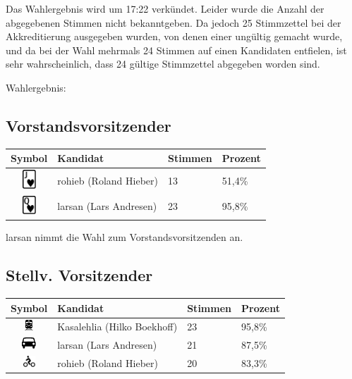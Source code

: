 \documentclass[a4paper,12pt]{scrartcl}
\begin{document}
Das Wahlergebnis wird um 17:22 verkündet. Leider wurde die Anzahl der
abgegebenen Stimmen nicht bekanntgeben. Da jedoch 25 Stimmzettel bei der
Akkreditierung ausgegeben wurden, von denen einer ungültig gemacht wurde, und
da bei der Wahl mehrmals 24 Stimmen auf einen Kandidaten entfielen, ist sehr
wahrscheinlich, dass 24 gültige Stimmzettel abgegeben worden sind.

Wahlergebnis:

\subsection*{Vorstandsvorsitzender}
\begin{tabular}{|c|l|l|l|}
  \hline
  \textbf{Symbol} & \textbf{Kandidat} & \textbf{Stimmen} & \textbf{Prozent} \\
  \hline
  \includegraphics[height=20pt]{images/mv20151206-wahl-1v-1.pdf} &
  rohieb (Roland Hieber) & 13 & 51{,}4\% \\
  \includegraphics[height=20pt]{images/mv20151206-wahl-1v-2.pdf} &
  larsan (Lars Andresen) & 23 & 95{,}8\% \\
  \hline
\end{tabular}

larsan nimmt die Wahl zum Vorstandsvorsitzenden an.

\subsection*{Stellv. Vorsitzender}
\begin{tabular}{|c|l|l|l|}
  \hline
  \textbf{Symbol} & \textbf{Kandidat} & \textbf{Stimmen} & \textbf{Prozent} \\
  \hline
  \includegraphics[height=12pt]{images/mv20151206-wahl-2v-1.pdf} &
  Kasalehlia (Hilko Boekhoff)  & 23 & 95{,}8\% \\
  \includegraphics[height=12pt]{images/mv20151206-wahl-2v-2.pdf} &
  larsan (Lars Andresen)       & 21 & 87{,}5\% \\
  \includegraphics[height=12pt]{images/mv20151206-wahl-2v-3.pdf} &
  rohieb (Roland Hieber)       & 20 & 83{,}3\% \\
  \hline
\end{tabular}
\end{document}
